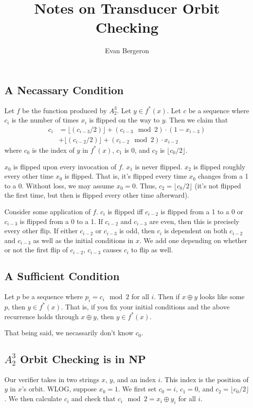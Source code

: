 \documentclass{article}
\title{Notes on Transducer Orbit Checking}
\author{Evan Bergeron}
\begin{document}
\maketitle
\subsection*{A Necassary Condition}
Let $f$ be the function produced by $A^3_2$. Let $y \in f^*(x)$. Let $c$ be a sequence where $c_i$ is the number of times $x_i$ is flipped on the way to $y$. Then we claim that
\begin{align*}
c_i &= \lfloor (c_{i-3} / 2) \rfloor + (c_{i-3} \mod{2}) \cdot (1 - x_{i-3})\\
    &+\lfloor (c_{i-2} / 2) \rfloor + (c_{i-2} \mod{2}) \cdot x_{i-2}
\end{align*}
where $c_0$ is the index of $y$ in $f^*(x)$, $c_1$ is 0, and $c_2$ is $\lfloor c_0 / 2 \rfloor$.

$x_0$ is flipped upon every invocation of $f$. $x_1$ is never flipped. $x_2$ is flipped roughly every other time $x_0$ is flipped. That is, it's flipped every time $x_0$ changes from a 1 to a 0. Without loss, we may assume $x_0 = 0$. Thus, $c_2 = \lfloor c_0 / 2 \rfloor$ (it's not flipped the first time, but then is flipped every other time afterward).

Consider some application of $f$. $c_i$ is flipped iff $c_{i-2}$ is flipped from a 1 to a 0 or $c_{i-3}$ is flipped from a 0 to a 1. If $c_{i-2}$ and $c_{i-3}$ are even, then this is precisely every other flip. If either $c_{i-2}$ or $c_{i-3}$ is odd, then $c_i$ is dependent on both $c_{i-2}$ and $c_{i-3}$ as well as the initial conditions in $x$. We add one depending on whether or not the first flip of $c_{i-2}$, $c_{i-3}$ causes $c_i$ to flip as well.

\subsection*{A Sufficient Condition}
Let $p$ be a sequence where $p_i = c_i \mod{2}$ for all $i$. Then if $x \oplus y$ looks like some $p$, then $y \in f^*(x)$. That is, if you fix your initial conditions and the above recurrence holds through $x \oplus y$, then $y \in f^*(x)$.

That being said, we necassarily don't know $c_0$.

\subsection*{$A^3_2$ Orbit Checking is in NP}
Our verifier takes in two strings $x$, $y$, and an index $i$. This index is the position of $y$ in $x$'s orbit. WLOG, suppose $x_0 = 1$. We first set $c_0 = i$, $c_1 = 0$, and $c_2 = \lfloor c_0 / 2 \rfloor$. We then calculate $c_i$ and check that $c_i \mod 2 = x_i \oplus y_i$ for all $i$.
\end{document}
